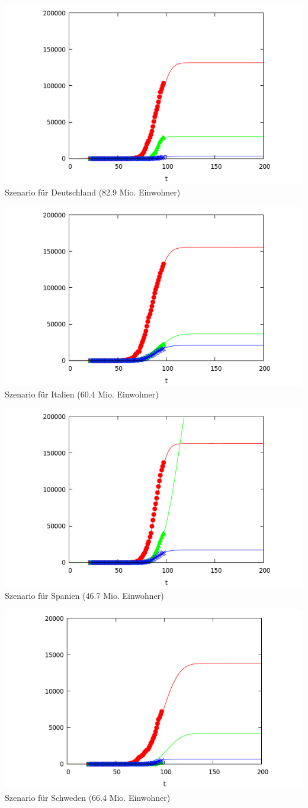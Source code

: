 \documentclass[a4paper,11pt]{article}
\begin{document}
\begin{center}
  \includegraphics[width=.8\textwidth]{Germany.png}\\[1em]
  {Szenario für Deutschland (82.9 Mio. Einwohner)}
  
  \includegraphics[width=.8\textwidth]{Italy.png}\\[1em]
  {Szenario für Italien (60.4 Mio. Einwohner)}

  \includegraphics[width=.8\textwidth]{Spain.png}\\[1em]
  {Szenario für Spanien (46.7 Mio. Einwohner)}
    
  \includegraphics[width=.8\textwidth]{Sweden.png}\\[1em]
  {Szenario für Schweden (66.4 Mio. Einwohner)}
    

\end{center}
\end{document}

